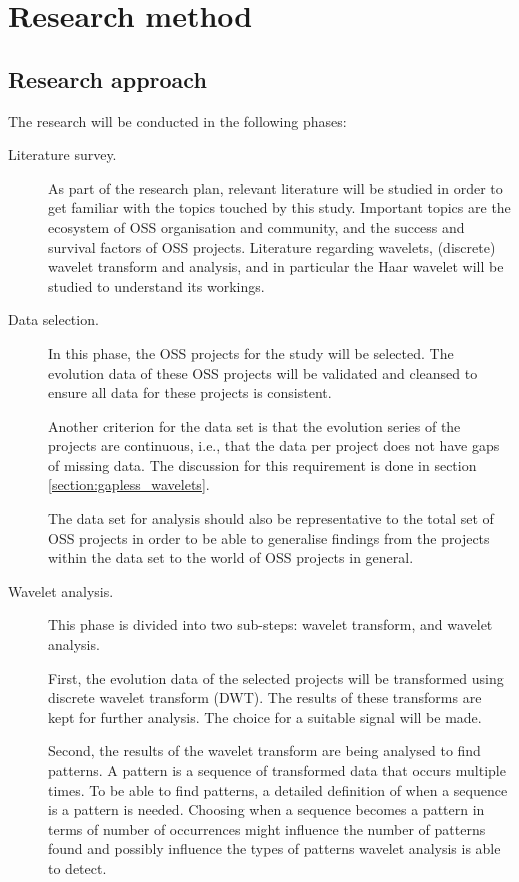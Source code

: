 \chapter{Research method}
\label{method}

\section{Research approach}
The research will be conducted in the following phases:
\begin{description}
	\item[Literature survey.] As part of the research plan, relevant literature
	will be studied in order to get familiar with the topics touched by this
	study. Important topics are the ecosystem of OSS organisation and community,
	and the success and survival factors of OSS projects. Literature regarding
	wavelets, (discrete) wavelet transform and analysis, and in particular the
	Haar wavelet will be studied to understand its workings.

	\item[Data selection.] In this phase, the OSS projects for the study will be
	selected. The evolution data of these OSS projects will be validated and
	cleansed to ensure all data for these projects is consistent.
	
	Another criterion for the data set is that the evolution series of the projects
	are continuous, i.e., that the data per project does not have gaps of missing
	data. The discussion for this requirement is done in section
	\ref{section:gapless_wavelets}.

	The data set for analysis should also be representative to the total set of
	OSS projects in order to be able to generalise findings from the
	projects within the data set to the world of OSS projects in general.
	
	\item[Wavelet analysis.] This phase is divided into two sub-steps: wavelet
	transform, and wavelet analysis.
	
	First, the evolution data of the selected projects will be transformed using
	discrete wavelet transform (DWT). The results of these transforms are kept for
	further analysis. The choice for a suitable signal will be made.
	
	Second, the results of the wavelet transform are being analysed to find
	patterns. A pattern is a sequence of transformed data that occurs multiple
	times. To be able to find patterns, a detailed definition of when a sequence
	is a pattern is needed. Choosing when a sequence becomes a pattern in terms of
	number of occurrences might influence the number of patterns found and
	possibly influence the types of patterns wavelet analysis is able to detect.
	

\end{description}
